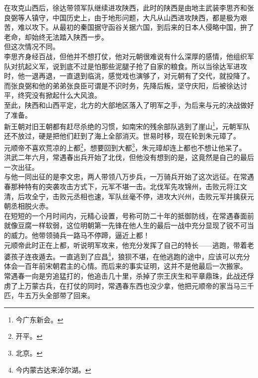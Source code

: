 \begin{multicols}{\theparacolNo}
在攻克山西后，徐达带领军队继续进攻陕西，此时的陕西是由地主武装李思齐和张良弼等人镇守，中国历史上，由于地形问题，大凡从山西进攻陕西，都是极为艰苦，难以攻下。从最初的秦国据守函谷关据六国，到后来的日本人侵略中国，拚了老命，却始终无法踏入陕西一步。\\

但这次情况不同。\\

李思齐身经百战，但他并不想打仗，他对元朝很难说有什么深厚的感情，他组织军队对抗起义军，说到底不过是怕那些泥腿子抢了自家的粮食。所以当徐达军进攻时，他一退再退，一直退到临洮，感觉戏也演够了，对元朝有了交代，就投降了。而张良弼和他的弟弟张良臣可谓是不识时务，先降后叛，坚守庆阳，后被徐达讨平，终究没有掀起什么大风浪。\\

至此，陕西和山西平定，北方的大部地区落入了明军之手，为后来与元的决战做好了准备。\\

新王朝对旧王朝都有赶尽杀绝的习惯，如南宋的残余部队逃到了崖山\footnote{今广东新会。}，元朝军队还不放过，硬是把他们赶到了海上全部消灭。世易时移，现在轮到朱元璋了。\\

元顺帝不喜欢荒凉的上都\footnote{开平。}，想要回到大都\footnote{北京。}，朱元璋却连上都也不想让他呆了。\\

洪武二年六月，常遇春出兵开始了北伐，但他没有想到的是，这竟然是自己的最后一次出征。\\

与他一同出征的是李文忠，两人带领八万步兵，一万骑兵开始了这次远征。在常遇春那种特有的突袭攻击方式下，元军不堪一击。北伐军先攻锦州，击败元将江文清，后攻全宁，击败元丞相也速，军队丝毫不停，进攻大兴州，击败元军并擒获元朝丞相脱火赤。\\

在短短的一个月时间内，元精心设置，号称可防二十年的抵御防线，在常遇春面前就像豆腐一样软弱，这位明朝第一先锋在他人生的最后一战中充分显现了锐不可当的威力。他带领骑兵一路马不停蹄，逼近上都！\\

元顺帝此时正在上都，听说明军攻来，他充分发挥了自己的特长——逃跑，带着老婆孩子连夜遁去。一直逃到了应昌\footnote{今内蒙古达来淖尔湖。}，狼狈不堪，在他逃跑的途中，应该可以充分体会一百年前宋朝君主的心情。而后来的事实证明，这并不是他最后一次搬家。\\

常遇春一向是穷追猛打的，他追击几十里，杀掉了宗王庆生和平章鼎珠，此战还俘虏了上万蒙古兵，在打仗的同时，常遇春东西也没少拿，他把元顺帝的家当马三千匹，牛五万头全部带了回来。\\


\end{multicols}
